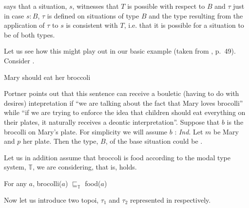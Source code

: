\preveg{} says that a situation, $s$, witnesses that $T$ is
possible with respect to $B$ and $\tau$ just in case $s:B$, $\tau$ is defined
on situations of type $B$ and the type
resulting from the application of $\tau$ to $s$ is consistent with $T$,
i.e. that it is possible for a situation to be of both types.

Let us see how this might play out in our basic example (taken from
\citealp{Portner2009}, p.~49). Consider \nexteg{}.
\begin{ex} 
Mary should eat her broccoli 
\end{ex} 
Portner points out that this sentence can receive a bouletic (having
to do with desires)
intepretation if ``we are talking about the fact that Mary loves
brocolli'' while ``if we are trying to enforce the idea that children
should eat everything on their plates, it naturally receives a deontic
interpretation''.  Suppose that $b$ is the brocolli on Mary's plate.
For simplicity we will assume $b$ : \textit{Ind}.  Let $m$ be Mary and
$p$ her plate.  Then the type, $B$, of the base situation could be
\nexteg{}.
\begin{ex} 
\label{ex:brocolli-on-plate}
\end{ex} 
Let us in addition assume that broccoli is food according to the modal
type system, $\mathbb{T}$, we are considering, that is, \nexteg{}
holds.
\begin{ex} 
For any $a$, brocolli($a$) $\sqsubseteq_{\mathbb{T}}$ food($a$) 
\label{ex:brocolli-food}
\end{ex} 
Now let us introduce two topoi, $\tau_1$ and $\tau_2$ represented in  respectively.
